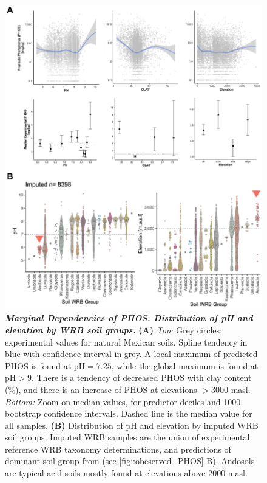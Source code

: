 \begin{figure}[!ht]
\includegraphics[width=0.9\linewidth]{Chapter-2/figs/marginal_dependencies.png}
\caption[Marginal Dependencies of PHOS. Distribution of pH and elevation by  WRB soil groups] {\textit{\textbf{Marginal Dependencies of PHOS. Distribution of pH and elevation by  WRB soil groups.}} \textbf{(A)} \textit{Top:} Grey circles: experimental values for natural Mexican soils. Spline tendency in blue with confidence interval in grey.  A local maximum of predicted PHOS is found at $\text{pH} = 7.25$, while the global maximum is found at $\text{pH}> 9$. There is a tendency of decreased PHOS with clay content (\%), and there is an increase of PHOS at elevations $> 3000$ masl.
\textit{Bottom:} Zoom on median values, for predictor deciles and 1000 bootstrap confidence intervals. Dashed line is the median value for all samples.
\textbf{(B)} Distribution of pH and elevation by imputed WRB  soil
groups. 
Imputed WRB samples are the union of experimental reference WRB taxonomy determinations, and predictions of dominant soil group from \citep{inegi2013} (see \autoref{fig::obeserved_PHOS} B).
Andosols are typical acid soils mostly found at elevations above 2000 masl.}
\label{fig::marginal_dependencies}
\end{figure}
\clearpage



